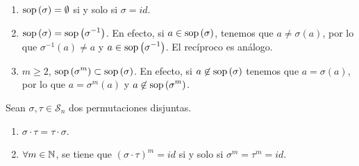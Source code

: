 \begin{observation}
\begin{enumerate}
\item $\displaystyle \operatorname{sop}\left(\sigma \right)= \emptyset $ si y solo si $\displaystyle \sigma = id $. 
\item $\displaystyle \operatorname{sop}\left(\sigma \right)= \operatorname{sop}\left(\sigma ^{-1}\right) $. En efecto, si $\displaystyle a \in \operatorname{sop}\left(\sigma \right) $, tenemos que $\displaystyle a \neq \sigma \left(a\right) $, por lo que $\displaystyle \sigma^{-1}\left(a\right) \neq a $ y $\displaystyle a \in \operatorname{sop}\left(\sigma^{-1}\right) $. El recíproco es análogo.
\item $\displaystyle m \geq 2 $, $\displaystyle \operatorname{sop}\left(\sigma^{m}\right) \subset \operatorname{sop}\left(\sigma \right) $. En efecto, si $\displaystyle a \not\in \operatorname{sop}\left(\sigma \right) $ tenemos que $\displaystyle a = \sigma\left(a\right) $, por lo que $\displaystyle a = \sigma^{m}\left(a\right) $ y $\displaystyle a \not\in \operatorname{sop}\left(\sigma^{m}\right) $. 
\end{enumerate}
\end{observation}
\begin{lema}
Sean $\displaystyle \sigma, \tau \in \mathcal{S}_{n} $ dos permutaciones disjuntas.
\begin{enumerate}
\item $\displaystyle \sigma \cdot \tau = \tau \cdot \sigma  $.
\item $\displaystyle \forall m \in \mathbb{N} $, se tiene que $\displaystyle \left(\sigma \cdot \tau\right)^{m} = id $ si y solo si $\displaystyle \sigma^{m} = \tau^{m} = id $.
\end{enumerate}
\end{lema}
